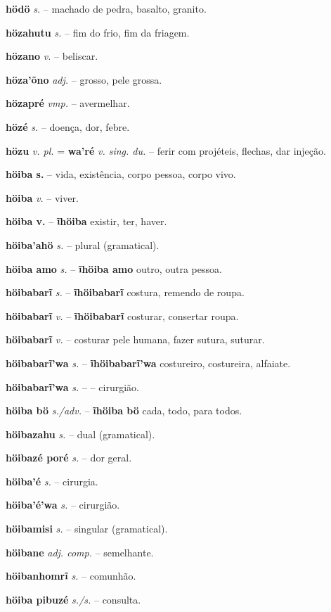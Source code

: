 \textbf{hödö} \textit{s.} -- machado de pedra, basalto, granito.

\textbf{hözahutu} \textit{s.} -- fim do frio, fim da friagem.

\textbf{hözano} \textit{v.} -- beliscar.

\textbf{höza'õno} \textit{adj.} -- grosso, pele grossa.

\textbf{hözapré} \textit{vmp.} -- avermelhar.

\textbf{hözé} \textit{s.} -- doença, dor, febre.

\textbf{hözu} \textit{v. pl.} = \textbf{wa'ré} \textit{v. sing. du.} -- ferir com projéteis, flechas, dar injeção.

\textbf{höiba s.} -- vida, existência, corpo pessoa, corpo vivo.

\textbf{höiba} \textit{v.} -- viver.

\textbf{höiba v.} -- \textbf{ĩhöiba} existir, ter, haver.

\textbf{höiba'ahö} \textit{s.} -- plural (gramatical).

\textbf{höiba amo} \textit{s.} -- \textbf{ĩhöiba amo} outro, outra pessoa.

\textbf{höibabarĩ} \textit{s.} -- \textbf{ĩhöibabarĩ} costura, remendo de roupa.

\textbf{höibabarĩ} \textit{v.} -- \textbf{ĩhöibabarĩ} costurar, consertar roupa.

\textbf{höibabarĩ} \textit{v.} -- costurar pele humana, fazer sutura, suturar.

\textbf{höibabarĩ'wa} \textit{s.} -- \textbf{ĩhöibabarĩ'wa} costureiro, costureira, alfaiate.

\textbf{höibabarĩ'wa} \textit{s.} -- -- cirurgião.

\textbf{höiba bö} \textit{s./adv.} -- \textbf{ĩhöiba bö} cada, todo, para todos.

\textbf{höibazahu} \textit{s.} -- dual (gramatical).

\textbf{höibazé poré} \textit{s.} -- dor geral.

\textbf{höiba'é} \textit{s.} -- cirurgia.

\textbf{höiba'é'wa} \textit{s.} -- cirurgião.

\textbf{höibamisi} \textit{s.} -- singular (gramatical).

\textbf{höibane} \textit{adj. comp.} -- semelhante.

\textbf{höibanhomrĩ} \textit{s.} -- comunhão.

\textbf{höiba pibuzé} \textit{s./s.} -- consulta.

